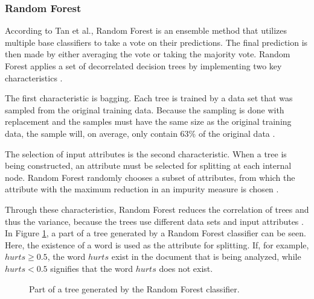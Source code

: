 \subsubsection{Random Forest}
        According to Tan et al., Random Forest is an ensemble method that utilizes multiple base classifiers to take a vote on their predictions. The final prediction is then made by either averaging the vote or taking the majority vote. Random Forest applies a set of decorrelated decision trees by implementing two key characteristics \cite{DBLP:books/aw/TanSKK2019}.
        
        The first characteristic is bagging. Each tree is trained by a data set that was sampled from the original training data. Because the sampling is done with replacement and the samples must have the same size as the original training data, the sample will, on average, only contain 63\% of the original data \cite{DBLP:books/aw/TanSKK2019}.
        
        The selection of input attributes is the second characteristic. When a tree is being constructed, an attribute must be selected for splitting at each internal node. Random Forest randomly chooses a subset of attributes, from which the attribute with the maximum reduction in an impurity measure is chosen \cite{DBLP:books/aw/TanSKK2019}.
        
        Through these characteristics, Random Forest reduces the correlation of trees and thus the variance, because the trees use different data sets and input attributes \cite{DBLP:books/aw/TanSKK2019}. In Figure \ref{fig:tree}, a part of a tree generated by a Random Forest classifier can be seen. Here, the existence of a word is used as the attribute for splitting. If, for example, $hurts \geq 0.5$, the word $hurts$ exist in the document that is being analyzed, while $hurts < 0.5$ signifies that the word $hurts$ does not exist.
        
        \begin{figure}
        \centering
    \caption{Part of a tree generated by the Random Forest classifier.}
      \label{fig:tree}
\end{figure}
